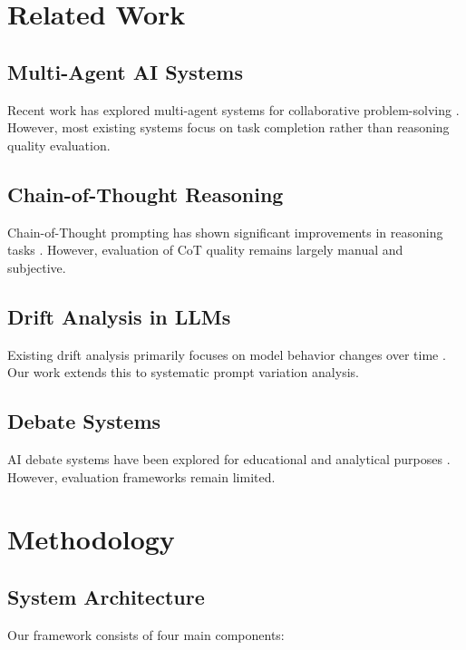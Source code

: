 \documentclass[11pt]{article}
\begin{document}
\section{Related Work}

\subsection{Multi-Agent AI Systems}

Recent work has explored multi-agent systems for collaborative problem-solving \cite{du2023multiagent, chan2024chateval}. However, most existing systems focus on task completion rather than reasoning quality evaluation.

\subsection{Chain-of-Thought Reasoning}

Chain-of-Thought prompting has shown significant improvements in reasoning tasks \cite{wei2022chain, kojima2022large}. However, evaluation of CoT quality remains largely manual and subjective.

\subsection{Drift Analysis in LLMs}

Existing drift analysis primarily focuses on model behavior changes over time \cite{chen2023behavior, li2025drift}. Our work extends this to systematic prompt variation analysis.

\subsection{Debate Systems}

AI debate systems have been explored for educational and analytical purposes \cite{slonim2021debater, rahman2025debate}. However, evaluation frameworks remain limited.

\section{Methodology}

\subsection{System Architecture}

Our framework consists of four main components:
\end{document}
